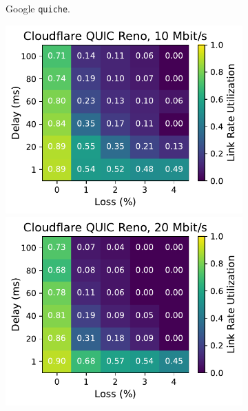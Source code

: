 \begin{figure}[ht]
\begin{subfigure}[b]{0.22\linewidth}
        \caption{Google \texttt{quiche}.}
    \end{subfigure}
    \begin{subfigure}[b]{0.22\linewidth}
        \includegraphics[width=\linewidth,trim={0 0 2cm 0},clip]{figures/heatmaps/heatmap_quiche_reno_10mbps.pdf}
        \includegraphics[width=\linewidth,trim={0 0 2cm 0},clip]{figures/heatmaps/heatmap_quiche_reno_20mbps.pdf}

\end{subfigure}
\end{figure}
